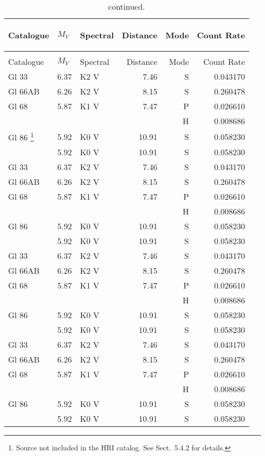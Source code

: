 \documentclass{aa}
\begin{document}
\begin{appendix}
\begin{longtable}{lllrrr}
\caption{A long table}\\
\label{ltapp}

Catalogue& $M_{V}$ & Spectral & Distance & Mode & Count Rate \\
\hline
\endfirsthead
\caption{continued.}\\
\hline
Catalogue& $M_{V}$ & Spectral & Distance & Mode & Count Rate \\
\hline
\endhead
\hline
\endfoot
Gl 33    & 6.37 & K2 V & 7.46 & S & 0.043170\\
Gl 66AB  & 6.26 & K2 V & 8.15 & S & 0.260478\\
Gl 68    & 5.87 & K1 V & 7.47 & P & 0.026610\\
         &      &      &      & H & 0.008686\\
Gl 86
\footnote{Source not included in the HRI catalog. See Sect.~5.4.2 for details.}
         & 5.92 & K0 V & 10.91& S & 0.058230\\
                  & 5.92 & K0 V & 10.91& S & 0.058230\\
Gl 33    & 6.37 & K2 V & 7.46 & S & 0.043170\\
Gl 66AB  & 6.26 & K2 V & 8.15 & S & 0.260478\\
Gl 68    & 5.87 & K1 V & 7.47 & P & 0.026610\\
         &      &      &      & H & 0.008686\\
Gl 86    & 5.92 & K0 V & 10.91& S & 0.058230\\            & 5.92 & K0 V & 10.91& S & 0.058230\\
Gl 33    & 6.37 & K2 V & 7.46 & S & 0.043170\\
Gl 66AB  & 6.26 & K2 V & 8.15 & S & 0.260478\\
Gl 68    & 5.87 & K1 V & 7.47 & P & 0.026610\\
         &      &      &      & H & 0.008686\\
Gl 86    & 5.92 & K0 V & 10.91& S & 0.058230\\            & 5.92 & K0 V & 10.91& S & 0.058230\\
Gl 33    & 6.37 & K2 V & 7.46 & S & 0.043170\\
Gl 66AB  & 6.26 & K2 V & 8.15 & S & 0.260478\\
Gl 68    & 5.87 & K1 V & 7.47 & P & 0.026610\\
         &      &      &      & H & 0.008686\\
Gl 86    & 5.92 & K0 V & 10.91& S & 0.058230\\            & 5.92 & K0 V & 10.91& S & 0.058230\\

\end{longtable}
\end{appendix}
\end{document}
